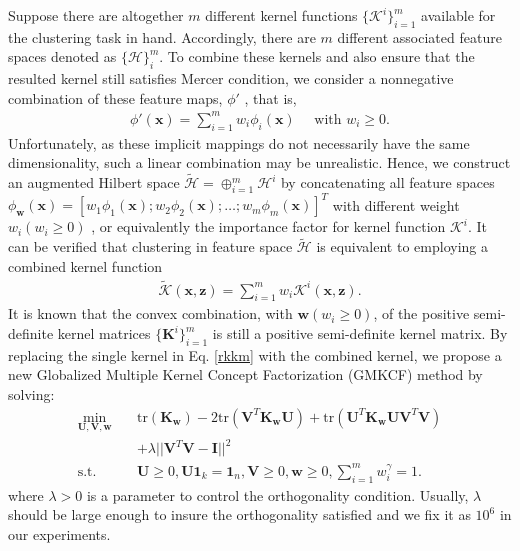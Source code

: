 \documentclass[10pt,journal,compsoc]{IEEEtran}
\newcommand{\st}{\mathrm{s.t.}}
\newcommand{\tr}{\mathrm{tr}}
\begin{document}
Suppose there are altogether $m$ different kernel functions $\{\mathcal{K}^{i}\}_{i=1}^{m}$ available for the clustering task in hand. Accordingly, there are $m$ different associated feature spaces denoted as $\{\mathcal{H}\}_i^m$. To combine these kernels and also ensure that the resulted kernel still satisfies Mercer condition, we consider a nonnegative combination of these feature maps, $\phi'$ , that is,
\begin{align}
\phi'(\mathbf{x}) = \sum_{i=1}^{m} w_i \phi_i(\mathbf{x}) \quad \text{ with } w_i \geq 0.
\end{align}
Unfortunately, as these implicit mappings do not necessarily have the same dimensionality, such a linear combination may be unrealistic.
Hence, we construct an augmented Hilbert space $\mathcal{\tilde{H}} = \oplus_{i=1}^{m} \mathcal{H}^i$ by concatenating all feature spaces $\phi_{\mathbf{w}}(\mathbf{x}) = [ w_1 \phi_{1}(\mathbf{x}); w_2 \phi_{2}(\mathbf{x}); \ldots; w_m \phi_{m}(\mathbf{x}) ]^T$ with different weight $w_i (w_i \geq 0)$ ,  or
equivalently the importance factor for kernel function $\mathcal{K}^i$. It can be verified that clustering in feature space $\mathcal{\tilde{H}}$ is equivalent to employing a combined kernel function \cite{zeng2011feature}
\begin{align}\label{update_Kw}
\tilde{\mathcal{K}}(\mathbf{x}, \mathbf{z}) = \sum_{i=1}^{m} w_i \mathcal{K}^{i}(\mathbf{x}, \mathbf{z}).
\end{align}
It is known that the convex combination, with $\mathbf{w} (w_i \geq 0)$, of the positive semi-definite kernel matrices $\{ \mathbf{K}^{i}\}_{i=1}^{m}$ is still a positive semi-definite kernel matrix. By replacing the single kernel in Eq. \eqref{rkkm} with the combined kernel, we propose a new Globalized Multiple Kernel Concept Factorization (GMKCF) method by solving:
\begin{align}\label{opt_glmkcf}
\min_{\mathbf{U}, \mathbf{V}, \mathbf{w}} \quad & \tr(\mathbf{K}_{\mathbf{w}}) - 2 \tr(\mathbf{V}^T \mathbf{K}_{\mathbf{w}} \mathbf{U}) + \tr(\mathbf{U}^T \mathbf{K}_{\mathbf{w}} \mathbf{U} \mathbf{V}^T \mathbf{V}) \nonumber \\
& +  \lambda ||\mathbf{V}^T \mathbf{V} - \mathbf{I}||^2 \\
\st \quad & \mathbf{U} \geq 0, \mathbf{U} \mathbf{1}_{k} = \mathbf{1}_{n}, \mathbf{V} \geq 0, \mathbf{w} \geq 0, \sum_{i=1}^{m} w_{i}^{\gamma} = 1. \nonumber
\end{align}
where $\lambda> 0$ is a parameter to control the orthogonality condition. Usually, $\lambda$ should be large enough to insure the orthogonality satisfied and we fix it as $10^6$ in our experiments.
\end{document}
